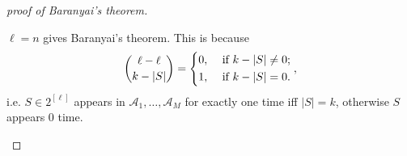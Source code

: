 \begin{proof}[proof of Baranyai's theorem]
    \begin{observation}
        \(\ell = n\) gives Baranyai's theorem. This is because 
        \[
            \binom{\ell - \ell}{k - \vert S \vert } = \begin{dcases}
                0, &\text{ if } k - \vert S \vert \neq 0  ;\\
                1, &\text{ if } k - \vert S \vert = 0.
            \end{dcases},
        \]
        i.e. \(S \in 2^{[\ell]}\) appears in \(\mathcal{A}_1, \dots , \mathcal{A}_M\) for exactly one time iff \(\vert S \vert = k \), otherwise \(S\) appears 0 time.  
    \end{observation}
\end{proof}